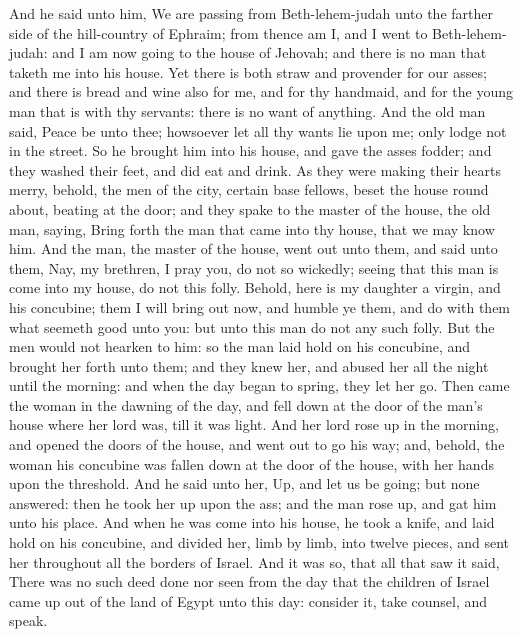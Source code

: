 And he said unto him, We are passing from Beth-lehem-judah unto the farther side of the hill-country of Ephraim; from thence am I, and I went to Beth-lehem-judah: and I am now going to the house of Jehovah; and there is no man that taketh me into his house. Yet there is both straw and provender for our asses; and there is bread and wine also for me, and for thy handmaid, and for the young man that is with thy servants: there is no want of anything. And the old man said, Peace be unto thee; howsoever let all thy wants lie upon me; only lodge not in the street. So he brought him into his house, and gave the asses fodder; and they washed their feet, and did eat and drink.  As they were making their hearts merry, behold, the men of the city, certain base fellows, beset the house round about, beating at the door; and they spake to the master of the house, the old man, saying, Bring forth the man that came into thy house, that we may know him. And the man, the master of the house, went out unto them, and said unto them, Nay, my brethren, I pray you, do not so wickedly; seeing that this man is come into my house, do not this folly. Behold, here is my daughter a virgin, and his concubine; them I will bring out now, and humble ye them, and do with them what seemeth good unto you: but unto this man do not any such folly. But the men would not hearken to him: so the man laid hold on his concubine, and brought her forth unto them; and they knew her, and abused her all the night until the morning: and when the day began to spring, they let her go. Then came the woman in the dawning of the day, and fell down at the door of the man’s house where her lord was, till it was light.  And her lord rose up in the morning, and opened the doors of the house, and went out to go his way; and, behold, the woman his concubine was fallen down at the door of the house, with her hands upon the threshold. And he said unto her, Up, and let us be going; but none answered: then he took her up upon the ass; and the man rose up, and gat him unto his place. And when he was come into his house, he took a knife, and laid hold on his concubine, and divided her, limb by limb, into twelve pieces, and sent her throughout all the borders of Israel. And it was so, that all that saw it said, There was no such deed done nor seen from the day that the children of Israel came up out of the land of Egypt unto this day: consider it, take counsel, and speak. 

